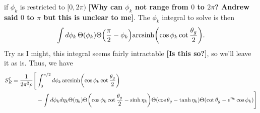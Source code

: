 \documentclass[11pt,twoside,reqno]{amsart}
\theoremstyle{plain}
\theoremstyle{remark}
\theoremstyle{definition}
\theoremstyle{remark}
\theoremstyle{definition}
\theoremstyle{definition}
\newcommand{\arcsinh}{\mathrm{arcsinh}}
\begin{document}
	if $\phi_k$ is restricted to $[0, 2\pi)$ {\color{red}\textbf{[Why can $\phi_k$ not range from $0$ to $2\pi$? Andrew said $0$ to $\pi$ but this is unclear to me]}}. The $\phi_k$ integral to solve is then
	\begin{equation}
		\int d\phi_k \,\Theta(\phi_k)\Theta\qty(\frac{\pi}{2} - \phi_k)\arcsinh\qty(\cos\phi_k\cot\frac{\theta_g}{2}).
	\end{equation}
	Try as I might, this integral seems fairly intractable {\color{red}\textbf{[Is this so?]}}, so we'll leave it as is. Thus, we have
	\begin{equation}\label{eq:gluon first integral}
	\begin{aligned}
		S_R^I = \frac{1}{2\pi^2\rho} \Bigg[ &\int_0^{\pi/2} d\phi_k \,\arcsinh\qty(\cos\phi_k\cot\frac{\theta_g}{2}) \\
			& - \int d\phi_k d\eta_k \Theta(\eta_k)\Theta\qty(\cos\phi_k \cot\frac{\theta_g}{2} - \sinh\eta_k)\Theta(\cos\theta_g - \tanh\eta_k)\Theta(\cot\theta_g - e^{\eta_k}\cos\phi_k)\Bigg]
	\end{aligned}
	\end{equation}
\end{document}

